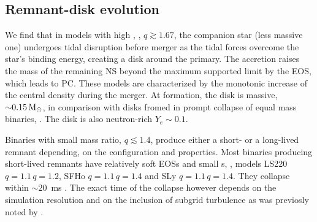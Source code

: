 \subsection{Remnant-disk evolution}


We find that in models with high \mr{}, \eg, $q\gtrsim1.67$, the companion star (less 
massive one) undergoes tidal disruption before merger as the tidal forces overcome the star's 
binding energy, creating a disk around the primary.
The accretion raises the mass of the remaining \ac{NS} beyond the maximum supported limit by the 
\ac{EOS}, which leads to \ac{PC}. 
These models are characterized by the monotonic increase of the central density during the merger.
%
At formation, the disk is massive, ${\sim}0.15\,{\text{M}_{\odot}}$, in comparison with 
disks fromed in prompt collapse of equal mass binaries, \citep[\eg][]{Radice:2018pdn}.  
The disk is also neutron-rich $Y_e\sim 0.1$.
%


Binaries with small mass ratio, $q\lesssim1.4$,
produce either a short- or a long-lived remnant depending, 
on the \pmerg{} configuration and properties. 
%
Most binaries producing short-lived remnants have relatively soft \acp{EOS}
and small \mr{}s, \eg, models LS220 $q=1.1\,q=1.2$, SFHo $q=1.1\,q=1.4$ 
and SLy $q=1.1\,q=1.4$. They collapse within ${\sim}20$~ms \pmerg. 
The exact time of the collapse however depends on the simulation resolution 
and on the inclusion of subgrid turbulence as was previosly noted by \citet{Radice:2017zta}.


